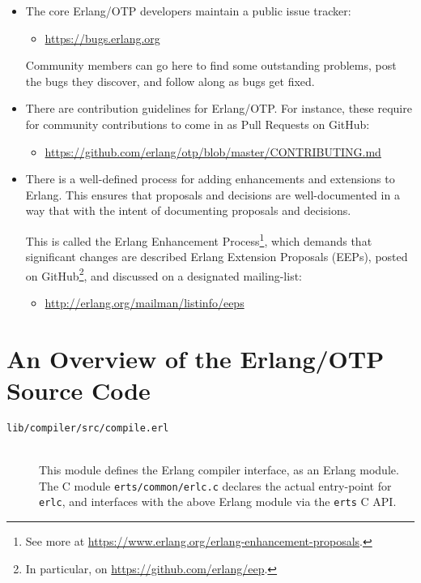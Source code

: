 \begin{itemize}
\item The core Erlang/OTP developers maintain a public issue tracker:

\begin{itemize}

\item \url{https://bugs.erlang.org}

\end{itemize}

Community members can go here to find some outstanding problems, post
the bugs they discover, and follow along as bugs get fixed.

\item There are contribution guidelines for Erlang/OTP. For instance,
these require for community contributions to come in as Pull Requests
on GitHub:

\begin{itemize}

\item \url{https://github.com/erlang/otp/blob/master/CONTRIBUTING.md}

\end{itemize}

\item There is a well-defined process for adding enhancements and
extensions to Erlang. This ensures that proposals and decisions are
well-documented in a way that with the intent of documenting proposals
and decisions.

This is called the Erlang Enhancement Process\footnote{See more at
\url{https://www.erlang.org/erlang-enhancement-proposals}.}, which
demands that significant changes are described Erlang Extension
Proposals (EEPs), posted on GitHub\footnote{In particular, on
\url{https://github.com/erlang/eep}.}, and discussed on a designated
mailing-list:

\begin{itemize}

\item \url{http://erlang.org/mailman/listinfo/eeps}

\end{itemize}

\end{itemize}

\section{An Overview of the Erlang/OTP Source Code}
\label{app:overview-of-erlang-source}

\begin{description}

\item[\texttt{lib/compiler/src/compile.erl}]\ \\

This module defines the Erlang compiler interface, as an Erlang
module. The C module \texttt{erts/common/erlc.c} declares the actual
entry-point for \texttt{erlc}, and interfaces with the above Erlang
module via the \texttt{erts} C API.

\end{description}
